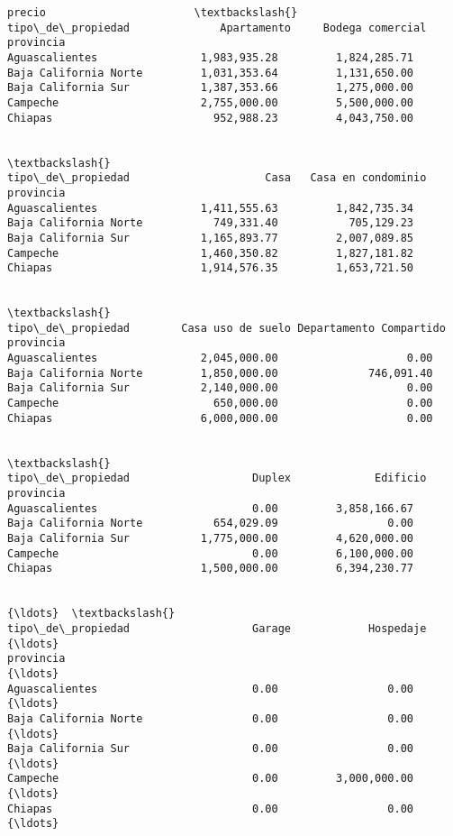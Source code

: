 \documentclass[11pt]{article}
\newcommand{\prompt}[4]{
        \llap{{\color{#2}[#3]: #4}}\vspace{-1.25em}
    }
\begin{document}
            \begin{tcolorbox}[breakable, boxrule=.5pt, size=fbox, pad at break*=1mm, opacityfill=0]
\prompt{Out}{outcolor}{84}{\hspace{3.5pt}}
\begin{Verbatim}[commandchars=\\\{\}]
                                    precio                       \textbackslash{}
tipo\_de\_propiedad              Apartamento     Bodega comercial
provincia
Aguascalientes                1,983,935.28         1,824,285.71
Baja California Norte         1,031,353.64         1,131,650.00
Baja California Sur           1,387,353.66         1,275,000.00
Campeche                      2,755,000.00         5,500,000.00
Chiapas                         952,988.23         4,043,750.00

                                                                 \textbackslash{}
tipo\_de\_propiedad                     Casa   Casa en condominio
provincia
Aguascalientes                1,411,555.63         1,842,735.34
Baja California Norte           749,331.40           705,129.23
Baja California Sur           1,165,893.77         2,007,089.85
Campeche                      1,460,350.82         1,827,181.82
Chiapas                       1,914,576.35         1,653,721.50

                                                                    \textbackslash{}
tipo\_de\_propiedad        Casa uso de suelo Departamento Compartido
provincia
Aguascalientes                2,045,000.00                    0.00
Baja California Norte         1,850,000.00              746,091.40
Baja California Sur           2,140,000.00                    0.00
Campeche                        650,000.00                    0.00
Chiapas                       6,000,000.00                    0.00

                                                                 \textbackslash{}
tipo\_de\_propiedad                   Duplex             Edificio
provincia
Aguascalientes                        0.00         3,858,166.67
Baja California Norte           654,029.09                 0.00
Baja California Sur           1,775,000.00         4,620,000.00
Campeche                              0.00         6,100,000.00
Chiapas                       1,500,000.00         6,394,230.77

                                                                 {\ldots}  \textbackslash{}
tipo\_de\_propiedad                   Garage            Hospedaje  {\ldots}
provincia                                                        {\ldots}
Aguascalientes                        0.00                 0.00  {\ldots}
Baja California Norte                 0.00                 0.00  {\ldots}
Baja California Sur                   0.00                 0.00  {\ldots}
Campeche                              0.00         3,000,000.00  {\ldots}
Chiapas                               0.00                 0.00  {\ldots}


\end{Verbatim}
\end{tcolorbox}
\end{document}
